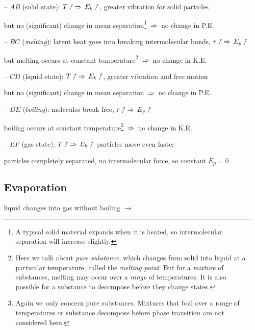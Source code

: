 \begin{compactitem}
\item[--] $AB$ (solid state): $T \nnearrow \, \Rightarrow \, E_k \nnearrow$, greater vibration for solid particles

but no (significant) change in mean separation\footnote{A typical solid material expands when it is heated, so intermolecular separation will increase slightly.} $\, \Rightarrow \,$ no change in P.E.

\item[--] $BC$ (\emph{melting}): latent heat goes into breaking intermolecular bonds, $r\nnearrow \, \Rightarrow \, E_p \nnearrow$

but melting occurs at constant temperature\footnote{Here we talk about \emph{pure substance}, which changes from solid into liquid at a particular temperature, called the \emph{melting point}. But for a \emph{mixture} of substances, melting may occur over a \emph{range} of temperatures. It is also possible for a substance to decompose before they change states.} $\, \Rightarrow \,$ no change in K.E.

\item[--] $CD$ (liquid state): $T \nnearrow \, \Rightarrow \, E_k \nnearrow$, greater vibration and free motion

but no (significant) change in mean separation $\, \Rightarrow \,$ no change in P.E.

\item[--] $DE$ (\emph{boiling}): molecules break free, $r\nnearrow \, \Rightarrow \, E_p \nnearrow$

boiling occurs at constant temperature\footnote{Again we only concern pure substances. Mixtures that boil over a range of temperatures or substance decompose before phase transition are not considered here.} $\, \Rightarrow \,$ no change in K.E.

\item[--] $EF$ (gas state): $T \nnearrow \, \Rightarrow \, E_k \nnearrow$ particles move even faster

particles completely separated, no intermolecular force, so constant $E_p = 0$
\end{compactitem}


\subsection*{Evaporation}

liquid changes into gas without boiling $\longrightarrow$ 

